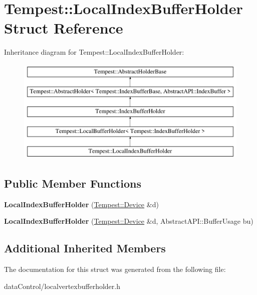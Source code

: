 \hypertarget{struct_tempest_1_1_local_index_buffer_holder}{\section{Tempest\+:\+:Local\+Index\+Buffer\+Holder Struct Reference}
\label{struct_tempest_1_1_local_index_buffer_holder}
}
Inheritance diagram for Tempest\+:\+:Local\+Index\+Buffer\+Holder\+:\begin{figure}[H]
\begin{center}
\leavevmode
\includegraphics[height=5.000000cm]{struct_tempest_1_1_local_index_buffer_holder}
\end{center}
\end{figure}
\subsection*{Public Member Functions}
\begin{DoxyCompactItemize}
\item 
\hypertarget{struct_tempest_1_1_local_index_buffer_holder_af1bf04b8bd1c84d75b1f5615edd7ca2f}{{\bfseries Local\+Index\+Buffer\+Holder} (\hyperlink{class_tempest_1_1_device}{Tempest\+::\+Device} \&d)}\label{struct_tempest_1_1_local_index_buffer_holder_af1bf04b8bd1c84d75b1f5615edd7ca2f}

\item 
\hypertarget{struct_tempest_1_1_local_index_buffer_holder_a01d676ad9db9970fa922977bfd1e0087}{{\bfseries Local\+Index\+Buffer\+Holder} (\hyperlink{class_tempest_1_1_device}{Tempest\+::\+Device} \&d, Abstract\+A\+P\+I\+::\+Buffer\+Usage bu)}\label{struct_tempest_1_1_local_index_buffer_holder_a01d676ad9db9970fa922977bfd1e0087}

\end{DoxyCompactItemize}
\subsection*{Additional Inherited Members}


The documentation for this struct was generated from the following file\+:\begin{DoxyCompactItemize}
\item 
data\+Control/localvertexbufferholder.\+h\end{DoxyCompactItemize}
